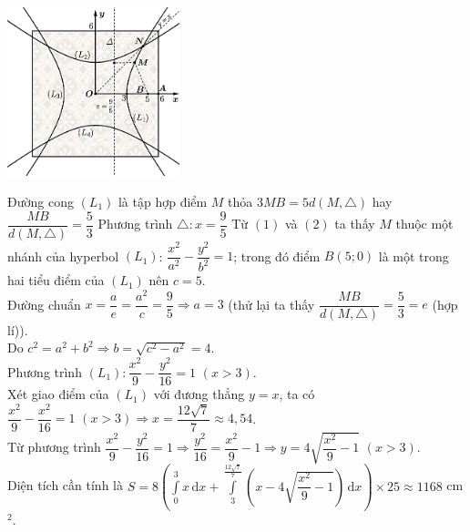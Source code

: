 \begin{ex}
{    \centerline{
        \includegraphics[width=5cm]{img/HXN-2-20-LG}
    }
    Đường cong $\left(L_1\right)$ là tập hợp điểm $M$ thỏa $3MB=5d\left(M,\triangle \right)$ hay $\dfrac{MB}{d\left(M,\triangle \right)}=\dfrac{5}{3}$
    Phương trình $\triangle \colon x=\dfrac{9}{5}$ 
    Từ $(1)$ và $(2)$ ta thấy $M$ thuộc một nhánh của hyperbol $\left(L_1\right)$: $\dfrac{x^2}{a^2}-\dfrac{y^2}{b^2}=1$; trong đó điểm $B(5;0)$ là một trong hai tiểu điểm của $\left(L_1\right)$ nên $c=5$.\\
    Đường chuẩn $x=\dfrac{a}{e}=\dfrac{a^2}{c}=\dfrac{9}{5}\Rightarrow a=3$ (thử lại ta thấy $\dfrac{MB}{d\left(M,\triangle \right)}=\dfrac{5}{3}=e$ (hợp lí)).\\
    Do $c^2=a^2+b^2\Rightarrow b=\sqrt{c^2-a^2}=4$.\\
    Phương trình $\left(L_1\right)\colon \dfrac{x^2}{9}-\dfrac{y^2}{16}=1$ $(x>3)$.\\
    Xét giao điểm của $\left(L_1\right)$ với đương thẳng $y=x$, ta có $\dfrac{x^2}{9}-\dfrac{x^2}{16}=1\,\,\left(x>3\right)\Rightarrow x=\dfrac{12\sqrt{7}}{7}\approx 4{,}54$.\\
    Từ phương trình $\dfrac{x^2}{9}-\dfrac{y^2}{16}=1\Rightarrow \dfrac{y^2}{16}=\dfrac{x^2}{9}-1\Rightarrow y=4\sqrt{\dfrac{x^2}{9}-1}$ $(x>3)$.\\
    Diện tích cần tính là $S=8\left(\int\limits_0^3{x\mathrm{\,d}x}+\int\limits_3^{\tfrac{12\sqrt{7}}{7}}{\left(x-4\sqrt{\dfrac{x^2}{9}-1}\right)\mathrm{\,d}x}\right)\times 25\approx 1168$ cm$^2$.
}
\end{ex}

